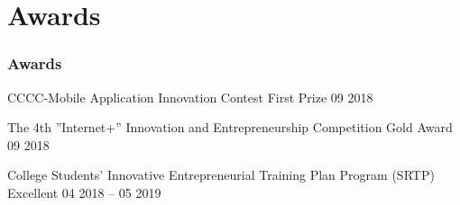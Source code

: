 \documentclass{beamer}
\begin{document}



\section{Awards}
\begin{frame}
    \frametitle{Awards}
    \begin{block}{CCCC-Mobile Application Innovation Contest}
        First Prize \hfill 09 2018
    \end{block}
    \begin{block}{The 4th ”Internet+” Innovation and Entrepreneurship Competition}
        Gold Award \hfill 09 2018
    \end{block}
    \begin{block}{College Students’ Innovative Entrepreneurial Training Plan Program (SRTP)}
        Excellent \hfill 04 2018 – 05 2019
    \end{block}
\end{frame}

\end{document}
